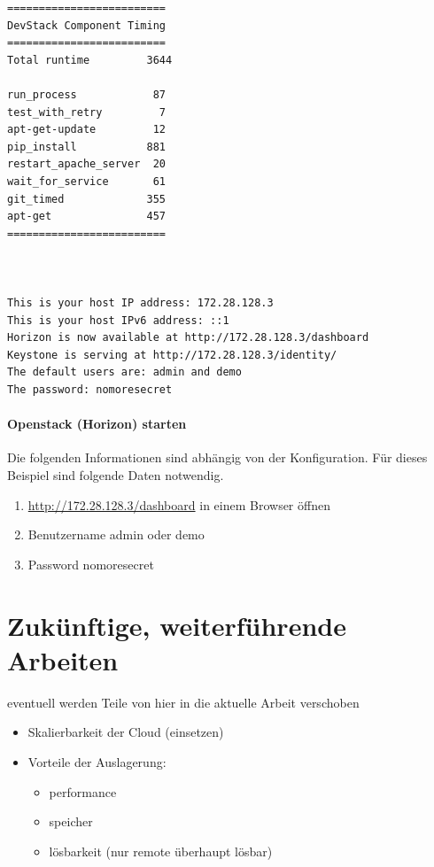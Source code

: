\documentclass[a4paper,10pt]{article}
\begin{document}
\begin{minipage}{\textwidth}
\begin{lstlisting}
=========================
DevStack Component Timing
=========================
Total runtime         3644

run_process            87
test_with_retry         7
apt-get-update         12
pip_install           881
restart_apache_server  20
wait_for_service       61
git_timed             355
apt-get               457
=========================



This is your host IP address: 172.28.128.3
This is your host IPv6 address: ::1
Horizon is now available at http://172.28.128.3/dashboard
Keystone is serving at http://172.28.128.3/identity/
The default users are: admin and demo
The password: nomoresecret
\end{lstlisting}
\end{minipage}

\paragraph{Openstack (Horizon) starten}

Die folgenden Informationen sind abhängig von der Konfiguration.
Für dieses Beispiel sind folgende Daten notwendig.

\begin{enumerate}
 \item \url{http://172.28.128.3/dashboard} in einem Browser öffnen
 \item Benutzername admin oder demo
 \item Password nomoresecret
\end{enumerate}

\newpage

\section{Zukünftige, weiterführende Arbeiten}

eventuell werden Teile von hier in die aktuelle Arbeit verschoben

\begin{itemize}
 \item Skalierbarkeit der Cloud (einsetzen)
 \item Vorteile der Auslagerung:
  \begin{itemize}
    \item performance
    \item speicher
    \item lösbarkeit (nur remote überhaupt lösbar)
  \end{itemize}

\end{itemize}
\end{document}

